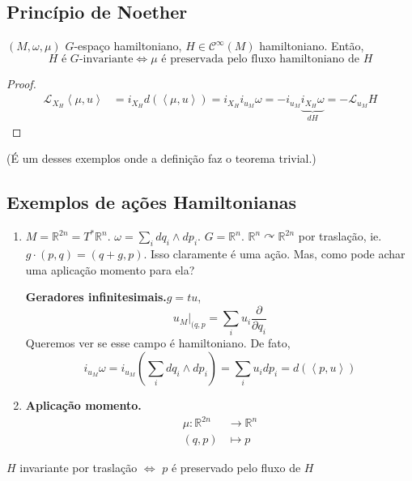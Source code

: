 \subsection{Princípio de Noether}

$(M,\omega,\mu)$ $G$-espaço hamiltoniano, $H\in\mathcal{C}^\infty(M)$ hamiltoniano. Então,
\[H \text{ é $G$-invariante}\iff \mu\text{ é preservada pelo fluxo hamiltoniano de }H  \]
\begin{proof}\leavevmode
	\begin{align*}
		\mathcal{L}_{X_H}\left<\mu,u\right> &=i_{X_H}d(\left<\mu,u\right> )=i_{X_H}i_{u_M} \omega=-i_{u_M} \underbrace{i_{X_H}\omega}_{dH}=-\mathcal{L}_{u_M}H
	\end{align*}
\end{proof}
(É um desses exemplos onde a definição faz o teorema trivial.)

\subsection{Exemplos de ações Hamiltonianas}

\begin{enumerate}
	\item $M=\mathbb{R}^{2n}=T^*\mathbb{R}^{n}$. $\omega=\sum_{i}dq_i\wedge dp_i$. $G=\mathbb{R}^{n}$. $\mathbb{R}^{n}\curvearrowright \mathbb{R}^{2n}$ por traslação, ie. $g\cdot(p,q)=(q+g,p)$. Isso claramente é uma ação. Mas, como pode achar uma aplicação momento para ela?

		{\color{4}\bfseries Geradores infinitesimais.}\hspace{.5em}$g=tu$,
		\[u_{M}|_{(q,p}=\sum_{i}u_i \frac{\partial }{\partial q_i}\]
		Queremos ver se esse campo é hamiltoniano. De fato,
		\[i_{u_M}\omega=i_{u_M}\left( \sum_{i}dq_i\wedge dp_i \right) =\sum_{i}u_i dp_i=d \left( \left<p,u\right>  \right) \]

	\item  {\color{4}\bfseries Aplicação momento.}\hspace{.5em}
\begin{align*}
	\mu: \mathbb{R}^{2n} &\longrightarrow \mathbb{R}^{n} \\
	(q,p) &\longmapsto p
\end{align*}

\end{enumerate}

\begin{thm}[Noether]\leavevmode
	$H$ invariante por traslação $\iff$ $p$ é preservado pelo fluxo de $H$
\end{thm}

